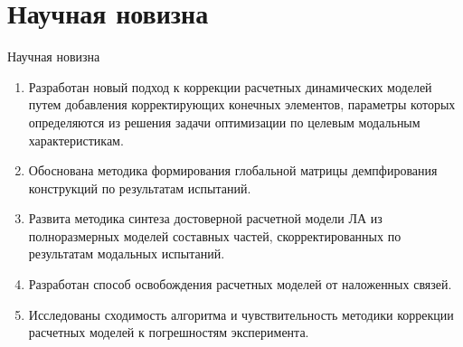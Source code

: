 
\section{Научная новизна}

\begin{frame}{Научная новизна}
	\begin{enumerate}
		\item Разработан новый подход к коррекции расчетных динамических моделей путем добавления корректирующих конечных элементов, параметры которых определяются из решения задачи оптимизации по целевым модальным характеристикам.
		\item Обоснована методика формирования глобальной матрицы демпфирования конструкций по результатам испытаний.
		\item Развита методика синтеза достоверной расчетной модели ЛА из полноразмерных моделей составных частей, скорректированных по результатам модальных испытаний.
		\item Разработан способ освобождения расчетных моделей от наложенных связей.
		\item Исследованы сходимость алгоритма и чувствительность методики коррекции расчетных моделей к погрешностям эксперимента. 
	\end{enumerate}
\end{frame}
